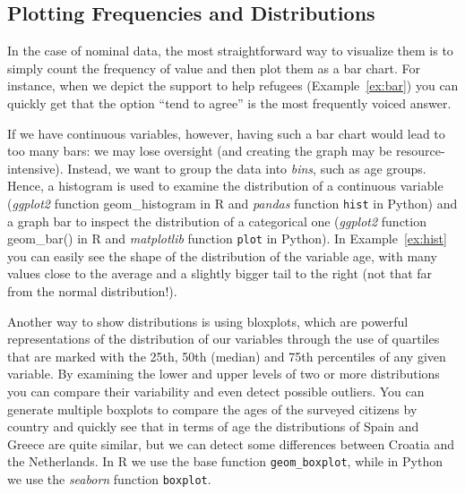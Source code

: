 \subsection{Plotting Frequencies and Distributions}\label{sec:barplot}
In the case of nominal data, the most straightforward way to visualize them is to simply count the frequency of value and then plot them as a bar chart. For instance, when we depict the support to help refugees (Example~\ref{ex:bar}) you can quickly get that the option ``tend to agree'' is the most frequently voiced answer.


If we have continuous variables, however, having such a bar chart would lead to too many bars: we may lose oversight (and creating the graph may be resource-intensive). Instead, we want to group the data into \emph{bins}, such as age groups.
Hence, a histogram is used to examine the distribution of a continuous variable (\emph{ggplot2} function geom\_histogram in R and \emph{pandas} function \texttt{hist} in Python) and a graph bar to inspect the distribution of a categorical one (\emph{ggplot2} function geom\_bar() in R and \emph{matplotlib} function \texttt{plot} in Python). In Example~\ref{ex:hist} you can easily see the shape of the distribution of the variable age, with many values close to the average and a slightly bigger tail to the right (not that far from the normal distribution!).


Another way to show distributions is using bloxplots, which are powerful representations of the distribution of our variables through the use of quartiles that are marked with the 25th, 50th (median) and 75th percentiles of any given variable. By examining the lower and upper levels of two or more distributions you can compare their variability and even detect possible outliers. You can generate multiple boxplots to compare the ages of the surveyed citizens by country and quickly see that in terms of age the distributions of Spain and Greece are quite similar, but we can detect some differences between Croatia and the Netherlands. In R we use the base function \texttt{geom\_boxplot}, while in Python we use the \emph{seaborn} function \texttt{boxplot}.

